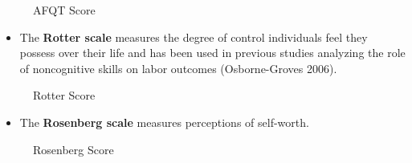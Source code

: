 \begin{frame}\begin{figure}[htp]\centering
\caption{AFQT Score}
\end{figure}\end{frame}
\begin{frame}
\begin{itemize}
\item The \textbf{Rotter scale} measures the degree of control individuals feel they
possess over their life and has been used in previous studies analyzing
the role of noncognitive skills on labor outcomes (Osborne-Groves 2006).
\end{itemize}
\end{frame}
\begin{frame}\begin{figure}[htp]\centering
\caption{Rotter Score}
\end{figure}\end{frame}
\begin{frame}
\begin{itemize}
\item The \textbf{Rosenberg scale} measures perceptions of self-worth.
\end{itemize}
\end{frame}
\begin{frame}\begin{figure}[htp]\centering
\caption{Rosenberg Score}
\end{figure}\end{frame}
